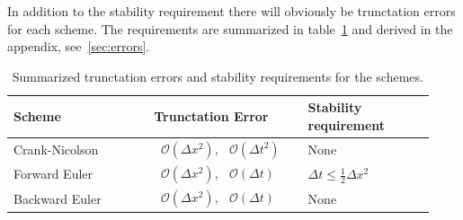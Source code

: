 \documentclass[aps,reprint]{revtex4-1}
\newcommand{\bigO}[1]{\ensuremath{\mathop{}\mathopen{}\mathcal{O}\mathopen{}\left(#1\right)}}
\begin{document}
In addition to the stability requirement there will obviously be trunctation errors
for each scheme. The requirements are summarized in table~\ref{table:errors} and derived in the
appendix, see~\ref{sec:errors}.
\begin{table}[H]
\centering
\caption{Summarized trunctation errors and stability requirements for the schemes.}
\label{table:errors}
\begin{tabular}{p{0.31\linewidth}|p{0.34\linewidth}|p{0.28\linewidth}}
\hline
Scheme         & Trunctation Error                          & Stability requirement                     \\ \hline
Crank-Nicolson & $\bigO{\Delta{x^2}}$, $\bigO{\Delta{t^2}}$ & None                                      \\
Forward Euler  & $\bigO{\Delta{x^2}}$, $\bigO{\Delta{t}}$   & $\Delta{t} \leq \frac{1}{2} \Delta{x^2}$  \\
Backward Euler & $\bigO{\Delta{x^2}}$, $\bigO{\Delta{t}}$   & None                                      \\ \hline
\end{tabular}
\end{table}
\end{document}
